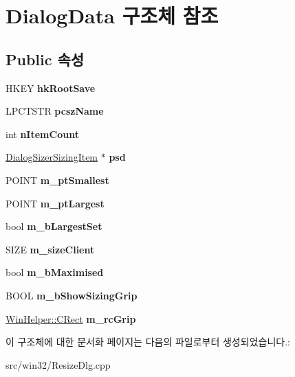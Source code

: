 \hypertarget{struct_dialog_data}{}\section{Dialog\+Data 구조체 참조}
\label{struct_dialog_data}
\subsection*{Public 속성}
\begin{DoxyCompactItemize}
\item 
\mbox{\label{struct_dialog_data_a25f688fc8282ac98c0d49658310425ce}} 
H\+K\+EY {\bfseries hk\+Root\+Save}
\item 
\mbox{\label{struct_dialog_data_a6ab5be3a7126b6f9b5fcb7131fcf2909}} 
L\+P\+C\+T\+S\+TR {\bfseries pcsz\+Name}
\item 
\mbox{\label{struct_dialog_data_acd196414db13af6456bbb413f2d1fa7d}} 
int {\bfseries n\+Item\+Count}
\item 
\mbox{\label{struct_dialog_data_aefb399f16dab34e6a2da67716d6147fc}} 
\mbox{\hyperlink{struct_dialog_sizer_sizing_item}{Dialog\+Sizer\+Sizing\+Item}} $\ast$ {\bfseries psd}
\item 
\mbox{\label{struct_dialog_data_a48eb19417544d0c6ddfd1bd9c03cd2e5}} 
P\+O\+I\+NT {\bfseries m\+\_\+pt\+Smallest}
\item 
\mbox{\label{struct_dialog_data_a577bccf59e71fb65969247d1f8275448}} 
P\+O\+I\+NT {\bfseries m\+\_\+pt\+Largest}
\item 
\mbox{\label{struct_dialog_data_abffcfeeb5f8f9b1ecd84d9bdf7706b07}} 
bool {\bfseries m\+\_\+b\+Largest\+Set}
\item 
\mbox{\label{struct_dialog_data_af63c4c59aa42a272798f9af446fc4484}} 
S\+I\+ZE {\bfseries m\+\_\+size\+Client}
\item 
\mbox{\label{struct_dialog_data_ad1a2c0f029c203945fde9ace5c82c625}} 
bool {\bfseries m\+\_\+b\+Maximised}
\item 
\mbox{\label{struct_dialog_data_aba0ab2f5717e72e528e95a8a1c6a651e}} 
B\+O\+OL {\bfseries m\+\_\+b\+Show\+Sizing\+Grip}
\item 
\mbox{\label{struct_dialog_data_a3d543e5db55fefcd025e18f74558de8d}} 
\mbox{\hyperlink{class_win_helper_1_1_c_rect}{Win\+Helper\+::\+C\+Rect}} {\bfseries m\+\_\+rc\+Grip}
\end{DoxyCompactItemize}


이 구조체에 대한 문서화 페이지는 다음의 파일로부터 생성되었습니다.\+:\begin{DoxyCompactItemize}
\item 
src/win32/Resize\+Dlg.\+cpp\end{DoxyCompactItemize}
